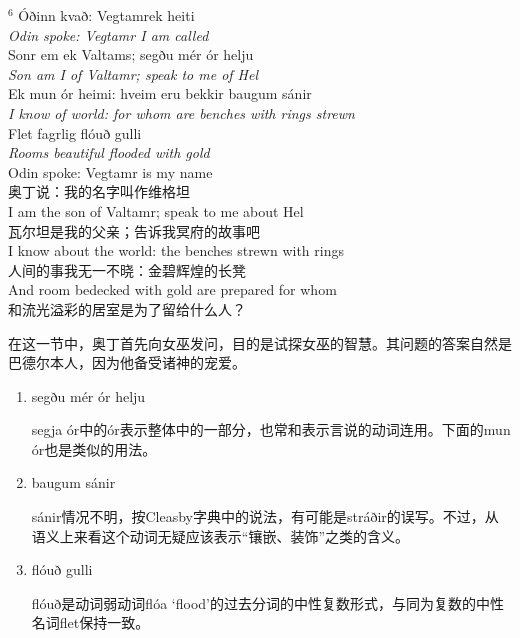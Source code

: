 \begin{paracol}{2}
    \noindent
    $^6$ Óðinn kvað: Vegtamr\footnotemark ek heiti\\
    \textit{Odin spoke: Vegtamr I am called}\\
    Sonr em ek Valtams; segðu mér ór helju\\
    \textit{Son am I of Valtamr; speak to me of Hel}\\
    Ek mun ór heimi: hveim eru bekkir baugum sánir\\
    \textit{I know of world: for whom are benches with rings strewn}\\
    Flet fagrlig flóuð gulli\\
    \textit{Rooms beautiful flooded with gold}\\
    \switchcolumn
    \noindent
    Odin spoke: Vegtamr is my name\\
    奥丁说：我的名字叫作维格坦\\
    I am the son of Valtamr; speak to me about Hel\\
    瓦尔坦是我的父亲；告诉我冥府的故事吧\\
    I know about the world: the benches strewn with rings\\
    人间的事我无一不晓：金碧辉煌的长凳\\
    And room bedecked with gold are prepared for whom  \\
    和流光溢彩的居室是为了留给什么人？\\
\end{paracol}

在这一节中，奥丁首先向女巫发问，目的是试探女巫的智慧。其问题的答案自然是巴德尔本人，因为他备受诸神的宠爱。


\begin{grammar*}{}
    \begin{enumerate}[leftmargin=*]
        \item segðu mér ór helju

              segja ór中的ór表示整体中的一部分，也常和表示言说的动词连用。下面的mun ór也是类似的用法。

        \item baugum sánir

              sánir情况不明，按Cleasby字典中的说法，有可能是stráðir的误写。不过，从语义上来看这个动词无疑应该表示“镶嵌、装饰”之类的含义。

        \item flóuð gulli

              flóuð是动词弱动词flóa `flood'的过去分词的中性复数形式，与同为复数的中性名词flet保持一致。
    \end{enumerate}
\end{grammar*}


